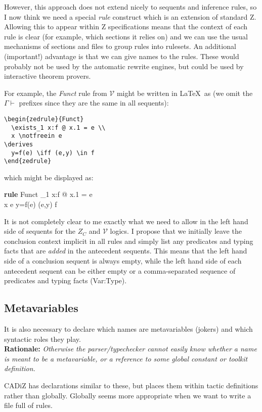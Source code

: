 \documentclass{article}
\newenvironment{Rationale}{\\ \textbf{Rationale:}\it}{}
\newcommand{\V}{\mathcal{V}}
\newenvironment{zedrule}[1]{\par\textbf{rule }#1\vspace{-2ex}\infrule}{\endinfrule}
\newcommand{\derives}{\derive{}}
\newcommand{\notfreein}{\mathbin{\backslash}}
\begin{document}
However, this approach does not extend nicely to sequents and
inference rules, so I now think we need a special \emph{rule} construct
which is an extension of standard Z.  Allowing this to appear within
Z specifications means that the context of each rule is clear
(for example, which sections it relies on) and we can use the usual
mechanisms of sections and files to group rules into rulesets.
An additional (important!) advantage is that we can give names
to the rules.  These would probably not be used by the automatic rewrite
engines, but could be used by interactive theorem provers.

For example, the \emph{Funct} rule from $\mathcal{V}$ might be
written in \LaTeX\ as (we omit the $\Gamma \vdash$ prefixes
since they are the same in all sequents):
\begin{verbatim}
\begin{zedrule}{Funct}
  \exists_1 x:f @ x.1 = e \\
  x \notfreein e
\derives
  y=f(e) \iff (e,y) \in f
\end{zedrule}
\end{verbatim}

which might be displayed as:
\begin{zedrule}{Funct}
  \exists_1 x:f @ x.1 = e \\
  x \notfreein e
\derives
  y=f(e) \iff (e,y) \in f
\end{zedrule}

It is not completely clear to me exactly what we need to
allow in the left hand side of sequents for the $Z_C$ and $\V$
logics.  I propose that we initially leave the conclusion context implicit
in all rules and simply list any predicates and typing facts that
are \emph{added} in the antecedent sequents.  This means that the
left hand side of a conclusion sequent is always empty, while the
left hand side of each antecedent sequent can be either empty or
a comma-separated sequence of predicates and typing facts (Var:Type).


\subsection{Metavariables}

It is also necessary to declare which names are metavariables
(jokers) and which syntactic roles they play.
\begin{Rationale}
  Otherwise the parser/typechecker cannot easily know whether
  a name is meant to be a metavariable, or a reference to some
  global constant or toolkit definition.

  CADiZ has declarations similar to these, but places them
  within tactic definitions rather than globally.  Globally
  seems more appropriate when we want to write a file full
  of rules.
\end{Rationale}
\end{document}
